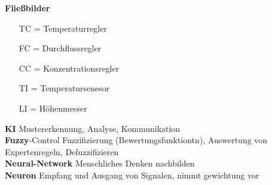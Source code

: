 \documentclass{article}
\begin{document}
\begin{multicols}{6}
\begin{figure}[H]
\end{figure}

\textbf{Fließbilder}
\begin{itemize}
	\item[TC] = Temperaturregler
	\item[FC] = Durchflussregler
	\item[CC] = Konzentrationsregler
	\item[TI] = Temperatursenesor
	\item[LI] = Höhenmesser
\end{itemize}

\textbf{KI}  Mustererkennung, Analyse, Kommunikation \\
\textbf{Fuzzy}-Control  Fuzzifizierung (Bewertungsfunktiontn), Auswertung von Expertenregeln, Defuzzifizieren \\
\textbf{Neural-Network}  Menschliches Denken nachbilden \\
\textbf{Neuron}  Empfang und Ausgang von Signalen, nimmt gewichtung vor \\



\end{multicols}
\end{document}
